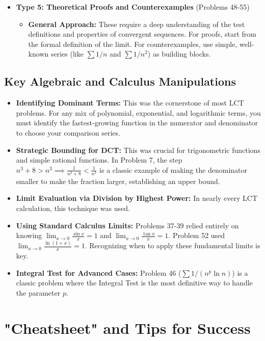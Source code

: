 \documentclass{article}
\begin{document}
\begin{itemize}
\begin{itemize}
    \end{itemize}
    \item \textbf{Type 5: Theoretical Proofs and Counterexamples} (Problems 48-55)
    \begin{itemize}
        \item \textbf{General Approach:} These require a deep understanding of the test definitions and properties of convergent sequences. For proofs, start from the formal definition of the limit. For counterexamples, use simple, well-known series (like \(\sum 1/n\) and \(\sum 1/n^2\)) as building blocks.
    \end{itemize}
\end{itemize}

\subsection{Key Algebraic and Calculus Manipulations}
\begin{itemize}
    \item \textbf{Identifying Dominant Terms:} This was the cornerstone of most LCT problems. For any mix of polynomial, exponential, and logarithmic terms, you must identify the fastest-growing function in the numerator and denominator to choose your comparison series.
    \item \textbf{Strategic Bounding for DCT:} This was crucial for trigonometric functions and simple rational functions. In Problem 7, the step \(n^3+8 > n^3 \implies \frac{1}{n^3+8} < \frac{1}{n^3}\) is a classic example of making the denominator smaller to make the fraction larger, establishing an upper bound.
    \item \textbf{Limit Evaluation via Division by Highest Power:} In nearly every LCT calculation, this technique was used.
    \item \textbf{Using Standard Calculus Limits:} Problems 37-39 relied entirely on knowing \(\lim_{x \to 0} \frac{\sin x}{x} = 1\) and \(\lim_{x \to 0} \frac{\tan x}{x} = 1\). Problem 52 used \(\lim_{x \to 0} \frac{\ln(1+x)}{x}=1\). Recognizing when to apply these fundamental limits is key.
    \item \textbf{Integral Test for Advanced Cases:} Problem 46 (\(\sum 1/(n^p \ln n)\)) is a classic problem where the Integral Test is the most definitive way to handle the parameter \(p\).
\end{itemize}

\section{"Cheatsheet" and Tips for Success}
\end{document}
